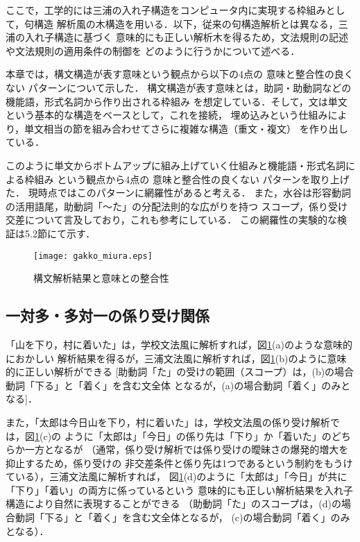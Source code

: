 \documentclass[japanese]{jnlp_1.2}
\begin{document}
ここで，工学的には三浦の入れ子構造をコンピュータ内に実現する枠組みとして，句構造
解析風の木構造を用いる．以下，従来の句構造解析とは異なる，三浦の入れ子構造に基づく
意味的にも正しい解析木を得るため，文法規則の記述や文法規則の適用条件の制御を
どのように行うかについて述べる．

本章では，構文構造が表す意味という観点から以下の4点の
意味と整合性の良くない
パターンについて示した．
構文構造が表す意味とは，助詞・助動詞などの機能語，形式名詞から作り出される枠組み
を想定している．そして，文は単文という基本的な構造をベースとして，これを接続，
埋め込みという仕組みにより，単文相当の節を組み合わせてさらに複雑な構造（重文・複文）
を作り出している．

このように単文からボトムアップに組み上げていく仕組みと機能語・形式名詞による枠組み
という観点から4点の
意味と整合性の良くない
パターンを取り上げた．
現時点ではこのパターンに網羅性があると考える．
また，水谷\cite{水谷1993}は形容動詞の活用語尾，助動詞「〜た」の分配法則的な広がりを持つ
スコープ，係り受け交差について言及しており，これも参考にしている．
この網羅性の実験的な検証は5.2節にて示す．

\begin{figure}[b]
  \centering
      \texttt{[image: gakko\_miura.eps]}
  \caption{構文解析結果と意味との整合性} \label{fig:gakko_miura}
\end{figure}

\subsection{一対多・多対一の係り受け関係}
「山を下り，村に着いた」は，学校文法風に解析すれば，図\ref{fig:gakko_miura}(a)のような意味的におかしい
解析結果を得るが，三浦文法風に解析すれば，図\ref{fig:gakko_miura}(b)のように意味的に正しい解析ができる
[助動詞「た」の受けの範囲（スコープ）は，(b)の場合動詞「下る」と「着く」を含む文全体
となるが，(a)の場合動詞「着く」のみとなる]．

また，「太郎は今日山を下り，村に着いた」は，学校文法風の係り受け解析では，図\ref{fig:gakko_miura}(c)の
ように「太郎は」「今日」の係り先は「下り」か「着いた」のどちらか一方となるが
（通常，係り受け解析では係り受けの曖昧さの爆発的増大を抑止するため，係り受けの
非交差条件と係り先は1つであるという制約をもうけている），三浦文法風に解析すれば，
図\ref{fig:gakko_miura}(d)のように「太郎は」「今日」が共に「下り」「着い」の両方に係っているという
意味的にも正しい解析結果を入れ子構造により自然に表現することができる
（助動詞「た」のスコープは，(d)の場合動詞「下る」と「着く」を含む文全体となるが，
(c)の場合動詞「着く」のみとなる）．
\end{document}
